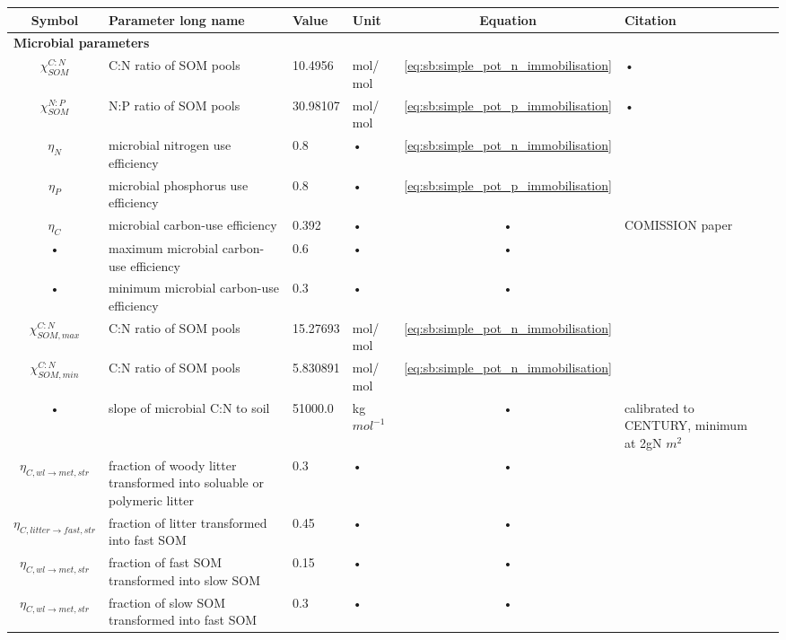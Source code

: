 \documentclass[11pt,oneside,openright,a4paper,fleqn]{book}  %
\begin{document}
\begin{table}
\begin{tabularx}{\linewidth}{|c|X|l|l|c|l|X|} %
\hline 
Symbol & Parameter long name & Value & Unit & Equation & Citation \\
\hline 

\multicolumn{6}{l}{\bf Microbial parameters}\\
\hline
$\chi_{SOM}^{C:N}$ & C:N ratio of SOM pools & 10.4956 & mol/ mol & \ref{eq:sb:simple_pot_n_immobilisation} & • \\
$\chi_{SOM}^{N:P}$ & N:P ratio of SOM pools & 30.98107 & mol/ mol & \ref{eq:sb:simple_pot_p_immobilisation} & • \\
$\eta_{N}$ & microbial nitrogen use efficiency & 0.8 & • & \ref{eq:sb:simple_pot_n_immobilisation} & \cite{Manzoni:2008hw} \\
$\eta_{P}$ & microbial phosphorus use efficiency & 0.8 & • & \ref{eq:sb:simple_pot_p_immobilisation} & \cite{Manzoni:2008hw} \\
$\eta_{C}$ & microbial carbon-use efficiency & 0.392 & • & • & COMISSION paper \\
• & maximum microbial carbon-use efficiency & 0.6 & • & • & \cite{Manzoni:2008hw} \\
• & minimum microbial carbon-use efficiency & 0.3 & • & • & \cite{Manzoni:2008hw} \\
$\chi_{SOM,max}^{C:N}$ & C:N ratio of SOM pools & 15.27693 & mol/ mol & \ref{eq:sb:simple_pot_n_immobilisation} & \cite{Manzoni:2008hw} \\
$\chi_{SOM,min}^{C:N}$ & C:N ratio of SOM pools & 5.830891 & mol/ mol & \ref{eq:sb:simple_pot_n_immobilisation} & \cite{Manzoni:2008hw} \\
• & slope of microbial C:N to soil & 51000.0 & kg $mol^{-1}$ & • & calibrated to CENTURY, minimum at 2gN $m^{2}$ \\
$\eta_{C,wl \rightarrow met,str}$ & fraction of woody litter transformed into soluable or polymeric litter & 0.3 & • & • &  \cite{Parton:1993ud} \\
$\eta_{C,litter \rightarrow fast,str}$ & fraction of litter transformed into fast SOM & 0.45 & • & • & \cite{Parton:1993ud} \\
$\eta_{C,wl \rightarrow met,str}$ & fraction of fast SOM transformed into slow SOM & 0.15 & • & • & \cite{Parton:1993ud} \\
$\eta_{C,wl \rightarrow met,str}$ & fraction of slow SOM transformed into fast SOM & 0.3 & • & • & \cite{Parton:1993ud} \\

\hline 
\end{tabularx}
\end{table}
\end{document}
